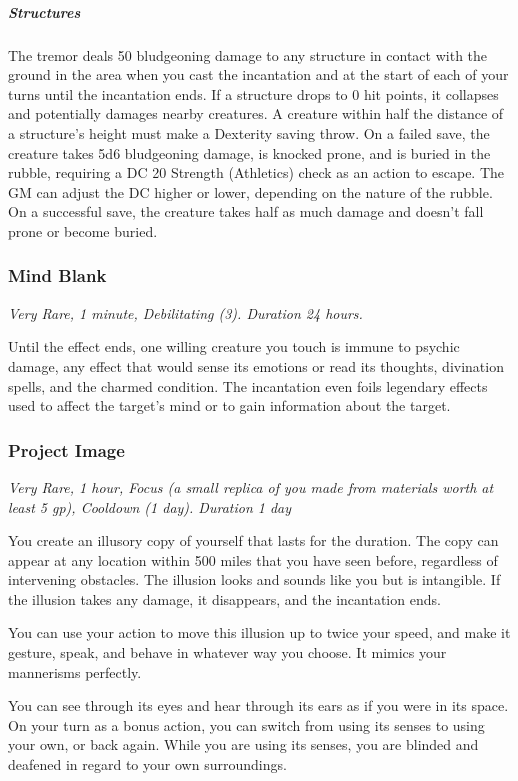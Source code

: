 \subparagraph*{Structures} The tremor deals 50 bludgeoning damage to any structure in contact with the ground in the area when you cast the incantation and at the start of each of your turns until the incantation ends. If a structure drops to 0 hit points, it collapses and potentially damages nearby creatures. A creature within half the distance of a structure's height must make a Dexterity saving throw. On a failed save, the creature takes 5d6 bludgeoning damage, is knocked prone, and is buried in the rubble, requiring a DC 20 Strength (Athletics) check as an action to escape. The GM can adjust the DC higher or lower, depending on the nature of the rubble. On a successful save, the creature takes half as much damage and doesn't fall prone or become buried.

\subsubsection{Mind Blank}
\textit{Very Rare, 1 minute, Debilitating (3). Duration 24 hours.}

Until the effect ends, one willing creature you touch is immune to psychic damage, any effect that would sense its emotions or read its thoughts, divination spells, and the charmed condition. The incantation even foils legendary effects used to affect the target's mind or to gain information about the target.

\subsubsection{Project Image}
\textit{Very Rare, 1 hour, Focus (a small replica of you made from materials worth at least 5 gp), Cooldown (1 day). Duration 1 day}

You create an illusory copy of yourself that lasts for the duration. The copy can appear at any location within 500 miles that you have seen before, regardless of intervening obstacles. The illusion looks and sounds like you but is intangible. If the illusion takes any damage, it disappears, and the incantation ends.

You can use your action to move this illusion up to twice your speed, and make it gesture, speak, and behave in whatever way you choose. It mimics your mannerisms perfectly.

You can see through its eyes and hear through its ears as if you were in its space. On your turn as a bonus action, you can switch from using its senses to using your own, or back again. While you are using its senses, you are blinded and deafened in regard to your own surroundings.

